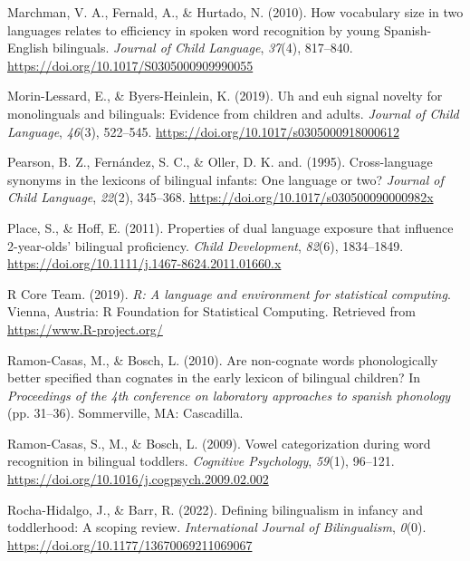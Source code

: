 \documentclass[
  ,man,floatsintext]{apa6}
\newlength{\cslhangindent}
\newlength{\cslentryspacingunit} %
\newenvironment{CSLReferences}[2] %
 {%
  \setlength{\parindent}{0pt}
  \ifodd #1
  \let\oldpar\par
  \def\par{\hangindent=\cslhangindent\oldpar}
  \fi
  \setlength{\parskip}{#2\cslentryspacingunit}
 }%
 {}
\begin{document}
\begin{CSLReferences}{1}{0}
\leavevmode{}%
Marchman, V. A., Fernald, A., \& Hurtado, N. (2010). How vocabulary size in two languages relates to efficiency in spoken word recognition by young {S}panish-{E}nglish bilinguals. \emph{Journal of Child Language}, \emph{37}(4), 817--840. \url{https://doi.org/10.1017/S0305000909990055}

\leavevmode{}%
Morin-Lessard, E., \& Byers-Heinlein, K. (2019). Uh and euh signal novelty for monolinguals and bilinguals: Evidence from children and adults. \emph{Journal of Child Language}, \emph{46}(3), 522--545. \url{https://doi.org/10.1017/s0305000918000612}

\leavevmode{}%
Pearson, B. Z., Fernández, S. C., \& Oller, D. K. and. (1995). Cross-language synonyms in the lexicons of bilingual infants: One language or two? \emph{Journal of Child Language}, \emph{22}(2), 345--368. \url{https://doi.org/10.1017/s030500090000982x}

\leavevmode{}%
Place, S., \& Hoff, E. (2011). Properties of dual language exposure that influence 2-year-olds' bilingual proficiency. \emph{Child Development}, \emph{82}(6), 1834--1849. \url{https://doi.org/10.1111/j.1467-8624.2011.01660.x}

\leavevmode{}%
R Core Team. (2019). \emph{R: A language and environment for statistical computing}. Vienna, Austria: R Foundation for Statistical Computing. Retrieved from \url{https://www.R-project.org/}

\leavevmode{}%
Ramon-Casas, M., \& Bosch, L. (2010). Are non-cognate words phonologically better specified than cognates in the early lexicon of bilingual children? In \emph{Proceedings of the 4th conference on laboratory approaches to spanish phonology} (pp. 31--36). Sommerville, MA: Cascadilla.

\leavevmode{}%
Ramon-Casas, S., M., \& Bosch, L. (2009). Vowel categorization during word recognition in bilingual toddlers. \emph{Cognitive Psychology}, \emph{59}(1), 96--121. \url{https://doi.org/10.1016/j.cogpsych.2009.02.002}

\leavevmode{}%
Rocha-Hidalgo, J., \& Barr, R. (2022). Defining bilingualism in infancy and toddlerhood: A scoping review. \emph{International Journal of Bilingualism}, \emph{0}(0). \url{https://doi.org/10.1177/13670069211069067}


\end{CSLReferences}
\end{document}
